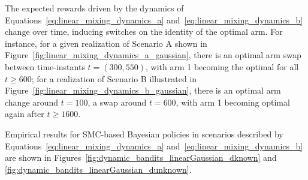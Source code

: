 The expected rewards driven by the dynamics of Equations~\eqref{eq:linear_mixing_dynamics_a} and~\eqref{eq:linear_mixing_dynamics_b} change over time,
inducing switches on the identity of the optimal arm.
%
For instance, for a given realization of Scenario A shown in Figure~\ref{fig:linear_mixing_dynamics_a_gaussian},
there is an optimal arm swap between time-instants $t=(300, 550)$, with arm 1 becoming the optimal for all $t\geq600$;
for a realization of Scenario B illustrated in Figure~\ref{fig:linear_mixing_dynamics_b_gaussian},
there is an optimal arm change around $t=100$, a swap around $t=600$,
with arm 1 becoming optimal again after $t\geq1600$.

Empirical results for SMC-based Bayesian policies in scenarios described by Equations~\eqref{eq:linear_mixing_dynamics_a} and~\eqref{eq:linear_mixing_dynamics_b}
are shown in Figures~\ref{fig:dynamic_bandits_linearGaussian_dknown} and \ref{fig:dynamic_bandits_linearGaussian_dunknown}.

